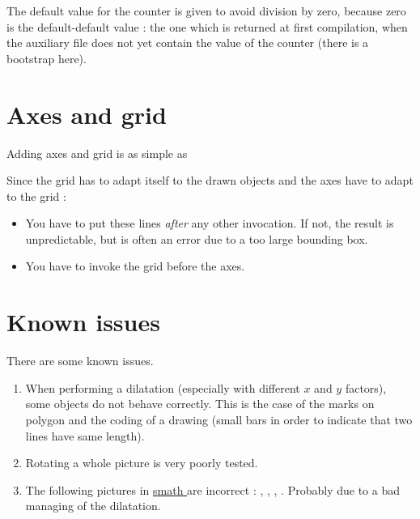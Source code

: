 The default value for the  counter is given to avoid division by zero, because zero is the default-default value : the one which is returned at first compilation, when the auxiliary file does not yet contain the value of the counter (there is a bootstrap here).

\section{Axes and grid}

Adding axes and grid is as simple as



Since the grid has to adapt itself to the drawn objects and the axes have to adapt to the grid :
\begin{itemize}
    \item You have to put these lines \emph{after} any other  invocation. If not, the result is unpredictable, but is often an error due to a too large bounding box.
    \item You have to invoke the grid before the axes.
\end{itemize}

\section{Known issues}

There are some known issues.
\begin{enumerate}
    \item
        When performing a dilatation (especially with different \( x\) and \( y\) factors), some objects do not behave correctly. This is the case of the marks on polygon and the coding of a drawing (small bars in order to indicate that two lines have same length).
    \item
        Rotating a whole picture is very poorly tested.
    \item The following pictures in \href{ http://laurent.claessens-donadello.eu/smath.pdf }{ smath } are incorrect :  ,  ,  ,  . Probably due to a bad managing of the dilatation.
\end{enumerate}
